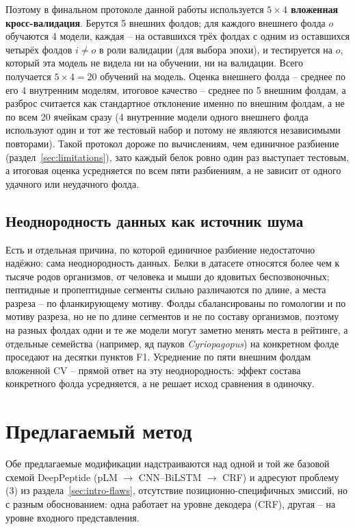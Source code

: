 \documentclass{article}
\begin{document}
Поэтому в финальном протоколе данной работы используется \textbf{$5\times4$ вложенная кросс-валидация}. Берутся 5 внешних фолдов; для каждого внешнего фолда $o$ обучаются 4 модели, каждая -- на оставшихся трёх фолдах с одним из оставшихся четырёх фолдов $i\ne o$ в роли валидации (для выбора эпохи), и тестируется на $o$, который эта модель не видела ни на обучении, ни на валидации. Всего получается $5\times4=20$ обучений на модель. Оценка внешнего фолда -- среднее по его 4 внутренним моделям, итоговое качество -- среднее по 5 внешним фолдам, а разброс считается как стандартное отклонение именно по внешним фолдам, а не по всем 20 ячейкам сразу (4 внутренние модели одного внешнего фолда используют один и тот же тестовый набор и потому не являются независимыми повторами). Такой протокол дороже по вычислениям, чем единичное разбиение (раздел~\ref{sec:limitations}), зато каждый белок ровно один раз выступает тестовым, а итоговая оценка усредняется по всем пяти разбиениям, а не зависит от одного удачного или неудачного фолда.

\subsection{Неоднородность данных как источник шума}

Есть и отдельная причина, по которой единичное разбиение недостаточно надёжно: сама неоднородность данных. Белки в датасете относятся более чем к тысяче родов организмов, от человека и мыши до ядовитых беспозвоночных; пептидные и пропептидные сегменты сильно различаются по длине, а места разреза -- по фланкирующему мотиву. Фолды сбалансированы по гомологии и по мотиву разреза, но не по длине сегментов и не по составу организмов, поэтому на разных фолдах одни и те же модели могут заметно менять места в рейтинге, а отдельные семейства (например, яд пауков \textit{Cyriopagopus}) на конкретном фолде проседают на десятки пунктов F1. Усреднение по пяти внешним фолдам вложенной CV -- прямой ответ на эту неоднородность: эффект состава конкретного фолда усредняется, а не решает исход сравнения в одиночку.

\section{Предлагаемый метод}
\label{sec:method}

Обе предлагаемые модификации надстраиваются над одной и той же базовой схемой DeepPeptide (pLM $\to$ CNN--BiLSTM $\to$ CRF) и адресуют проблему (3) из раздела~\ref{sec:intro-flaws}, отсутствие позиционно-специфичных эмиссий, но с разным обоснованием: одна работает на уровне декодера (CRF), другая -- на уровне входного представления.
\end{document}
